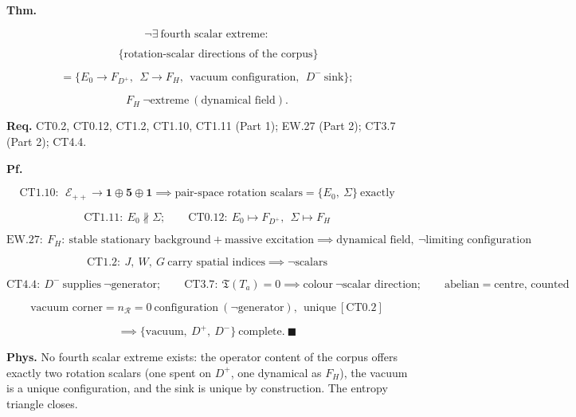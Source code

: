\begin{theorem}\label{tag:CT4-10}
\textbf{Thm.}

\[
\neg\exists\ \text{fourth scalar extreme}:
\]

\[
\qquad \{\text{rotation-scalar directions of the corpus}\}
\]

\[
= \{E_0\to F_{D^+},\ \ \Sigma\to F_H,\ \ \text{vacuum configuration},\ \ D^-\ \text{sink}\};
\]

\[
F_H\ \neg\text{extreme}\ (\text{dynamical field}).
\]

\textbf{Req.} CT0.2, CT0.12, CT1.2, CT1.10, CT1.11 (Part 1); EW.27 (Part 2); CT3.7 (Part 2); CT4.4.

\textbf{Pf.}

\[
\mathrm{CT1.10}:\ \ \mathcal E_{++}\to\mathbf1\oplus\mathbf5\oplus\mathbf1\implies\text{pair-space rotation scalars}=\{E_0,\ \Sigma\}\ \text{exactly}
\]

\[
\mathrm{CT1.11}:\ E_0\nparallel\Sigma;\qquad\mathrm{CT0.12}:\ E_0\mapsto F_{D^+},\ \ \Sigma\mapsto F_H
\]

\[
\mathrm{EW.27}:\ F_H:\ \text{stable stationary background}+\text{massive excitation}\implies\text{dynamical field},\ \neg\text{limiting configuration}
\]

\[
\mathrm{CT1.2}:\ J,\ W,\ G\ \text{carry spatial indices}\implies\neg\text{scalars}
\]

\[
\mathrm{CT4.4}:\ D^-\ \text{supplies}\ \neg\text{generator};\qquad
\mathrm{CT3.7}:\ \mathfrak T(T_a)=0\implies\text{colour}\ \neg\text{scalar direction};\qquad
\text{abelian}=\text{centre, counted}
\]

\[
\text{vacuum corner}=n_{\mathcal R}=0\ \text{configuration}\ (\neg\text{generator}),\ \ \text{unique}\ [\mathrm{CT0.2}]
\]

\[
\implies\{\text{vacuum},\ D^+,\ D^-\}\ \text{complete}.\ \blacksquare
\]

\textbf{Phys.} No fourth scalar extreme exists: the operator content of the corpus offers exactly two rotation scalars (one spent on $D^+$, one dynamical as $F_H$), the vacuum is a unique configuration, and the sink is unique by construction. The entropy triangle closes.

\end{theorem}

